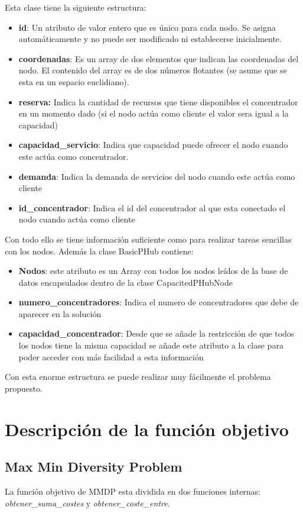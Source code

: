 \documentclass[12pt,a4paper,draft,openany]{article}
\begin{document}
Esta clase tiene la siguiente estructura:
\begin{itemize}
\item \textbf{id}: Un atributo de valor entero que es único para cada nodo. Se asigna automáticamente y no puede ser modificado ni establecerse inicialmente.
\item \textbf{coordenadas}: Es un array de dos elementos que indican las coordenadas del nodo. El contenido del array es de dos números flotantes (se asume que se esta en un espacio euclidiano).
\item \textbf{reserva:} Indica la cantidad de recursos que tiene disponibles el concentrador en un momento dado (si el nodo actúa como cliente el valor sera igual a la capacidad)
\item \textbf{capacidad\_servicio}: Indica que capacidad puede ofrecer el nodo cuando este actúa como concentrador.
\item \textbf{demanda}: Indica la demanda de servicios del nodo cuando este actúa como cliente
\item \textbf{id\_concentrador}: Indica el id del concentrador al que esta conectado el nodo cuando actúa como cliente
\end{itemize}

Con todo ello se tiene información suficiente como para realizar tareas sencillas con los nodos. Además la clase BasicPHub contiene:

\begin{itemize}
\item \textbf{Nodos}: este atributo es un Array con todos los nodos leídos de la base de datos encapsulados dentro de la clase CapacitedPHubNode
\item \textbf{numero\_concentradores}: Indica el numero de concentradores que debe de aparecer en la solución
\item \textbf{capacidad\_concentrador}: Desde que se añade la restricción de que todos los nodos tiene la misma capacidad se añade este atributo a la clase para poder acceder con más facilidad a esta información
\end{itemize}

Con esta enorme estructura se puede realizar muy fácilmente el problema propuesto.
\section{Descripción de la función objetivo}
\subsection{Max Min Diversity Problem}
La función objetivo de MMDP esta dividida en dos funciones internas: \emph{obtener\_suma\_costes} y \emph{obtener\_coste\_entre}.
\end{document}
